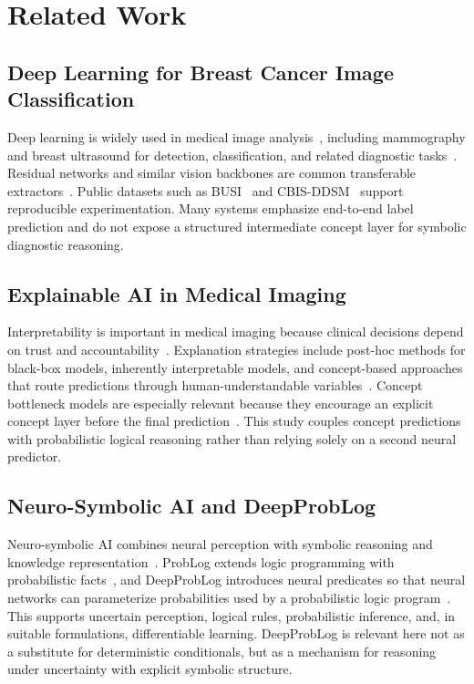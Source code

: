 \section{Related Work}
\label{sec:related}

\subsection{Deep Learning for Breast Cancer Image Classification}
Deep learning is widely used in medical image analysis~\cite{litjens2017survey}, including mammography and breast ultrasound for detection, classification, and related diagnostic tasks~\cite{balkenende2022application}. Residual networks and similar vision backbones are common transferable extractors~\cite{he2016resnet}. Public datasets such as BUSI~\cite{aldhabyani2020busi} and CBIS-DDSM~\cite{lee2017cbis} support reproducible experimentation. Many systems emphasize end-to-end label prediction and do not expose a structured intermediate concept layer for symbolic diagnostic reasoning.

\subsection{Explainable AI in Medical Imaging}
Interpretability is important in medical imaging because clinical decisions depend on trust and accountability~\cite{vandervelden2022xai,rudin2019stop}. Explanation strategies include post-hoc methods for black-box models, inherently interpretable models, and concept-based approaches that route predictions through human-understandable variables~\cite{koh2020concept}. Concept bottleneck models are especially relevant because they encourage an explicit concept layer before the final prediction~\cite{koh2020concept}. This study couples concept predictions with probabilistic logical reasoning rather than relying solely on a second neural predictor.

\subsection{Neuro-Symbolic AI and DeepProbLog}
Neuro-symbolic AI combines neural perception with symbolic reasoning and knowledge representation~\cite{garcez2002neural,garcez2023neurosymbolic}. ProbLog extends logic programming with probabilistic facts~\cite{deraedt2007problog}, and DeepProbLog introduces neural predicates so that neural networks can parameterize probabilities used by a probabilistic logic program~\cite{manhaeve2018deepproblog,manhaeve2021neural}. This supports uncertain perception, logical rules, probabilistic inference, and, in suitable formulations, differentiable learning. DeepProbLog is relevant here not as a substitute for deterministic conditionals, but as a mechanism for reasoning under uncertainty with explicit symbolic structure.

